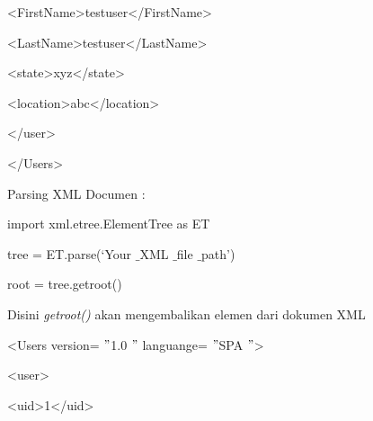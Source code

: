 \noindent 
{\fontsize{10pt}{10pt}\selectfont  \hspace*{0.5in}  \hspace*{0.5in} <FirstName>testuser</FirstName>} \par
\noindent 
{\fontsize{10pt}{10pt}\selectfont  \hspace*{0.5in}  \hspace*{0.5in} <LastName>testuser</LastName>} \par
\noindent 
{\fontsize{10pt}{10pt}\selectfont  \hspace*{0.5in}  \hspace*{0.5in} <state>xyz</state>} \par
\noindent 
{\fontsize{10pt}{10pt}\selectfont  \hspace*{0.5in}  \hspace*{0.5in} <location>abc</location>} \par
\noindent 
{\fontsize{10pt}{10pt}\selectfont  \hspace*{0.5in} </user>} \par
\noindent 
{\fontsize{10pt}{10pt}\selectfont </Users>} \par
\vspace{10pt}
\noindent 
Parsing XML Documen : \par
\vspace{12pt}
\noindent 
{\fontsize{10pt}{10pt}\selectfont import xml.etree.ElementTree as ET} \par
\noindent 
{\fontsize{10pt}{10pt}\selectfont tree = ET.parse(‘Your $  \_  $XML $  \_  $file $  \_  $path’)} \par
\noindent 
{\fontsize{10pt}{10pt}\selectfont root = tree.getroot()} \par
\noindent 
{\fontsize{10pt}{10pt}\selectfont 



\newpage

}\vspace{10pt}
\vspace{10pt}
\noindent 
Disini \textit{getroot()} akan mengembalikan elemen dari dokumen XML \par
\vspace{10pt}
\noindent 
{\fontsize{10pt}{10pt}\selectfont <Users version= $ " $1.0 $ " $ languange= $ " $SPA $ " $>} \par
\noindent 
{\fontsize{10pt}{10pt}\selectfont  \hspace*{0.5in} <user>} \par
\noindent 
{\fontsize{10pt}{10pt}\selectfont  \hspace*{0.5in}  \hspace*{0.5in} <uid>1</uid>} \par
